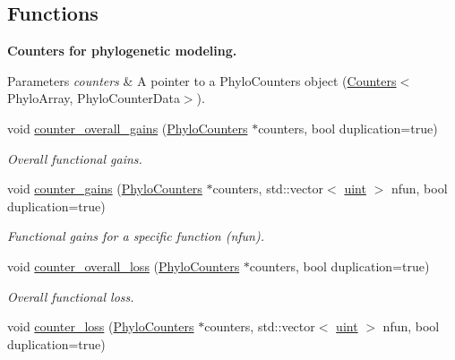 \subsection*{Functions}
\begin{Indent}\textbf{ Counters for phylogenetic modeling.}\par
{\em 
\begin{DoxyParams}{Parameters}
{\em counters} & A pointer to a {\ttfamily Phylo\+Counters} object ({\ttfamily \hyperlink{classbarry_1_1_counters}{Counters}}$<${\ttfamily Phylo\+Array}, {\ttfamily Phylo\+Counter\+Data}$>$). \\
\hline
\end{DoxyParams}
}\begin{DoxyCompactItemize}
\item 
void \hyperlink{namespacebarry_1_1counters_1_1phylo_ae1e599324d656660ce8730b77efcbcce}{counter\+\_\+overall\+\_\+gains} (\hyperlink{namespacebarry_1_1counters_1_1phylo_a4e401ffe66d04091343dcffaf915f8c3}{Phylo\+Counters} $\ast$counters, bool duplication=true)
\begin{DoxyCompactList}\small\item\em Overall functional gains. \end{DoxyCompactList}\item 
void \hyperlink{namespacebarry_1_1counters_1_1phylo_afc1215e596c2f5a5e3b6f39273427a9a}{counter\+\_\+gains} (\hyperlink{namespacebarry_1_1counters_1_1phylo_a4e401ffe66d04091343dcffaf915f8c3}{Phylo\+Counters} $\ast$counters, std\+::vector$<$ \hyperlink{namespacebarry_a11dfc53ddb4672278319aa04f1e09a6c}{uint} $>$ nfun, bool duplication=true)
\begin{DoxyCompactList}\small\item\em Functional gains for a specific function ({\ttfamily nfun}). \end{DoxyCompactList}\item 
void \hyperlink{namespacebarry_1_1counters_1_1phylo_a79ccde09af0d3d47b1a3162a16bc4597}{counter\+\_\+overall\+\_\+loss} (\hyperlink{namespacebarry_1_1counters_1_1phylo_a4e401ffe66d04091343dcffaf915f8c3}{Phylo\+Counters} $\ast$counters, bool duplication=true)
\begin{DoxyCompactList}\small\item\em Overall functional loss. \end{DoxyCompactList}\item 
void \hyperlink{namespacebarry_1_1counters_1_1phylo_affbd49d13928ece0a2f100261375d2a7}{counter\+\_\+loss} (\hyperlink{namespacebarry_1_1counters_1_1phylo_a4e401ffe66d04091343dcffaf915f8c3}{Phylo\+Counters} $\ast$counters, std\+::vector$<$ \hyperlink{namespacebarry_a11dfc53ddb4672278319aa04f1e09a6c}{uint} $>$ nfun, bool duplication=true)

\end{DoxyCompactItemize}
\end{Indent}
